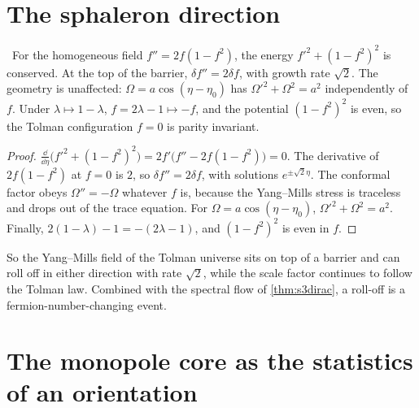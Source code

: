 \section{The sphaleron direction}

\begin{proposition}\label{prop:sphaleron}\ver\
For the homogeneous field $f''=2f(1-f^2)$, the energy $f'^2+(1-f^2)^2$ is conserved. At the top of the barrier, $\delta f''=2\delta f$, with growth rate $\sqrt2$. The geometry is unaffected: $\Omega=a\cos(\eta-\eta_0)$ has $\Omega'^2+\Omega^2=a^2$ independently of $f$. Under $\lambda\mapsto1-\lambda$, $f=2\lambda-1\mapsto-f$, and the potential $(1-f^2)^2$ is even, so the Tolman configuration $f=0$ is parity invariant.
\end{proposition}
\begin{proof}
$\frac{\dd}{\dd\eta}\bigl(f'^2+(1-f^2)^2\bigr)=2f'\bigl(f''-2f(1-f^2)\bigr)=0$. The derivative of $2f(1-f^2)$ at $f=0$ is $2$, so $\delta f''=2\delta f$, with solutions $e^{\pm\sqrt2\eta}$. The conformal factor obeys $\Omega''=-\Omega$ whatever $f$ is, because the Yang--Mills stress is traceless and drops out of the trace equation. For $\Omega=a\cos(\eta-\eta_0)$, $\Omega'^2+\Omega^2=a^2$. Finally, $2(1-\lambda)-1=-(2\lambda-1)$, and $(1-f^2)^2$ is even in $f$.
\end{proof}


So the Yang--Mills field of the Tolman universe sits on top of a barrier and can roll off in either direction with rate $\sqrt2$, while the scale factor continues to follow the Tolman law. Combined with the spectral flow of \cref{thm:s3dirac}, a roll-off is a fermion-number-changing event.

\section{The monopole core as the statistics of an orientation}

